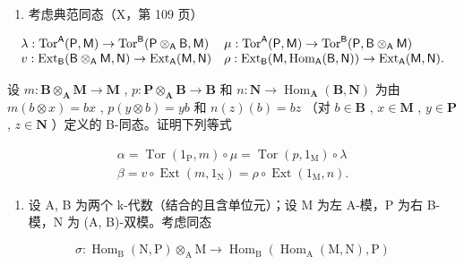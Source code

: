 \begin{enumerate}
\def\labelenumi{\alph{enumi})}
\setcounter{enumi}{1}
\tightlist
\item
  考虑典范同态（X，第 109 页）
\end{enumerate}

\[
\begin{array}{l l} \lambda : \operatorname{Tor} ^ {\mathsf {A}} (\mathsf {P}, \mathsf {M}) \to \operatorname{Tor} ^ {\mathsf {B}} (\mathsf {P} \otimes_ {\mathsf {A}} \mathsf {B}, \mathsf {M}) & \mu : \operatorname{Tor} ^ {\mathsf {A}} (\mathsf {P}, \mathsf {M}) \to \operatorname{Tor} ^ {\mathsf {B}} (\mathsf {P}, \mathsf {B} \otimes_ {\mathsf {A}} \mathsf {M}) \\ v: \operatorname{Ext} _ {\mathsf {B}} (\mathsf {B} \otimes_ {\mathsf {A}} \mathsf {M}, \mathsf {N}) \to \operatorname{Ext} _ {\mathsf {A}} (\mathsf {M}, \mathsf {N}) & \rho : \operatorname{Ext} _ {\mathsf {B}} (\mathsf {M}, \operatorname{Hom} _ {\mathsf {A}} (\mathsf {B}, \mathsf {N})) \to \operatorname{Ext} _ {\mathsf {A}} (\mathsf {M}, \mathsf {N}). \end{array}
\]

设 \(m: \mathbf{B} \otimes_{\mathbf{A}} \mathbf{M} \to \mathbf{M}\) , \(p: \mathbf{P} \otimes_{\mathbf{A}} \mathbf{B} \to \mathbf{B}\) 和 \(n: \mathbf{N} \to \operatorname{Hom}_{\mathbf{A}}(\mathbf{B}, \mathbf{N})\) 为由 \(m(b \otimes x) = bx\) , \(p(y \otimes b) = yb\) 和 \(n(z)(b) = bz\) （对 \(b \in \mathbf{B}\) , \(x \in \mathbf{M}\) , \(y \in \mathbf{P}\) , \(z \in \mathbf{N}\) ）定义的 B-同态。证明下列等式

\[
\begin{array}{l} \alpha = \operatorname{Tor} (1 _ {\mathrm{P}}, m) \circ \mu = \operatorname{Tor} (p, 1 _ {\mathrm{M}}) \circ \lambda \\ \beta = v \circ \operatorname{Ext} (m, 1 _ {\mathrm{N}}) = \rho \circ \operatorname{Ext} (1 _ {\mathrm{M}}, n). \end{array}
\]

\begin{enumerate}
\def\labelenumi{\arabic{enumi})}
\setcounter{enumi}{1}
\tightlist
\item
  设 A, B 为两个 k-代数（结合的且含单位元）；设 M 为左 A-模，P 为右 B-模，N 为 (A, B)-双模。考虑同态
\end{enumerate}

\[
\sigma : \operatorname{Hom} _ {\mathrm{B}} (\mathrm{N}, \mathrm{P}) \otimes_ {\mathrm{A}} \mathrm{M} \rightarrow \operatorname{Hom} _ {\mathrm{B}} (\operatorname{Hom} _ {\mathrm{A}} (\mathrm{M}, \mathrm{N}), \mathrm{P})
\]

